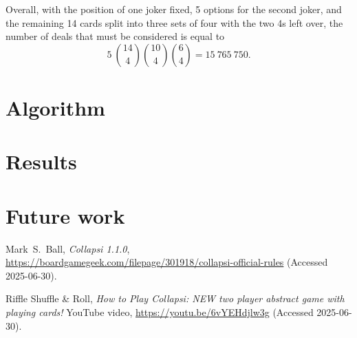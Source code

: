 \documentclass[a4paper, twocolumn]{article}
\begin{document}
Overall, with the position of one joker fixed, 5 options for the second joker,
and the remaining 14 cards split into three sets of four with the two 4s left
over, the number of deals that must be considered is equal to
$$5~\binom{14}{4} \binom{10}{4} \binom{6}{4} = 15~765~750.$$


\section{Algorithm}

\section{Results}

\section{Future work}

\begin{thebibliography}{9}

  Mark~S.~Ball,
  \textit{Collapsi 1.1.0},
  \url{https://boardgamegeek.com/filepage/301918/collapsi-official-rules}
  (Accessed 2025-06-30).

  Riffle Shuffle \& Roll,
  \textit{How to Play Collapsi: NEW two player abstract game with playing cards!}
  YouTube video,
  \url{https://youtu.be/6vYEHdjlw3g}
  (Accessed 2025-06-30).

\end{thebibliography}
\end{document}
